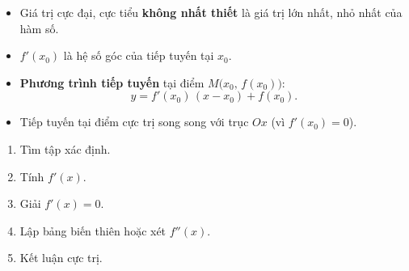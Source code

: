 \documentclass[12pt,a4paper]{article}
\begin{document}
\begin{luuy}
  \begin{itemize}
    \item Giá trị cực đại, cực tiểu \textbf{không nhất thiết} là giá trị lớn nhất, nhỏ nhất của hàm số.
    \item $f'(x_0)$ là hệ số góc của tiếp tuyến tại $x_0$.
    \item \textbf{Phương trình tiếp tuyến} tại điểm $M\bigl(x_0,\, f(x_0)\bigr)$:
      \[
        y = f'(x_0)\,(x - x_0) + f(x_0).
      \]
    \item Tiếp tuyến tại điểm cực trị song song với trục $Ox$ (vì $f'(x_0) = 0$).
  \end{itemize}
\end{luuy}

\begin{phuongphap}[title={Các bước tìm cực trị}]
  \begin{enumerate}
    \item Tìm tập xác định.
    \item Tính $f'(x)$.
    \item Giải $f'(x) = 0$.
    \item Lập bảng biến thiên hoặc xét $f''(x)$.
    \item Kết luận cực trị.
  \end{enumerate}
\end{phuongphap}
\end{document}
